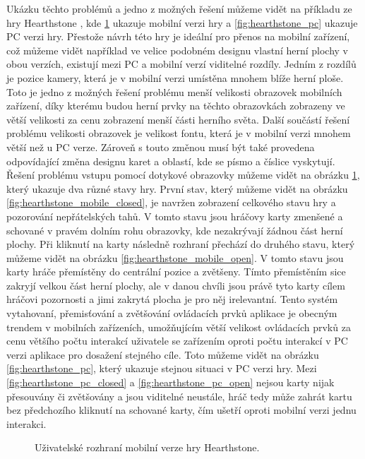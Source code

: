 Ukázku těchto problémů a jedno z možných řešení můžeme vidět na příkladu ze hry Hearthstone \citep{site:hearthstone}, kde  \ref{fig:hearthstone_mobile} ukazuje mobilní verzi hry a \ref{fig:hearthstone_pc} ukazuje PC verzi hry. Přestože návrh této hry je ideální pro přenos na mobilní zařízení, což můžeme vidět například ve velice podobném designu vlastní herní plochy v obou verzích, existují mezi PC a mobilní verzí viditelné rozdíly. Jedním z rozdílů je pozice kamery, která je v mobilní verzi umístěna mnohem blíže herní ploše. Toto je jedno z možných řešení problému menší velikosti obrazovek mobilních zařízení, díky kterému budou herní prvky na těchto obrazovkách zobrazeny ve větší velikosti za cenu zobrazení menší části herního světa. Další součástí řešení problému velikosti obrazovek je velikost fontu, která je v mobilní verzi mnohem větší než u PC verze. Zároveň s touto změnou musí být také provedena odpovídající změna designu karet a oblastí, kde se písmo a číslice vyskytují. Řešení problému vstupu pomocí dotykové obrazovky můžeme vidět na obrázku \ref{fig:hearthstone_mobile}, který ukazuje dva různé stavy hry. První stav, který můžeme vidět na obrázku \ref{fig:hearthstone_mobile_closed}, je navržen zobrazení celkového stavu hry a pozorování nepřátelských tahů. V tomto stavu jsou hráčovy karty zmenšené a schované v pravém dolním rohu obrazovky, kde nezakrývají žádnou část herní plochy. Při kliknutí na karty následně rozhraní přechází do druhého stavu, který můžeme vidět na obrázku \ref{fig:hearthstone_mobile_open}. V tomto stavu jsou karty hráče přemístěny do centrální pozice a zvětšeny. Tímto přemístěním sice zakryjí velkou část herní plochy, ale v danou chvíli jsou právě tyto karty cílem hráčovi pozornosti a jimi zakrytá plocha je pro něj irelevantní. Tento systém vytahovaní, přemisťování a zvětšování ovládacích prvků aplikace je obecným trendem v mobilních zařízeních, umožňujícím větší velikost ovládacích prvků za cenu většího počtu interakcí uživatele se zařízením oproti počtu interakcí v PC verzi aplikace pro dosažení stejného cíle. Toto můžeme vidět na obrázku \ref{fig:hearthstone_pc}, který ukazuje stejnou situaci v PC verzi hry. Mezi \ref{fig:hearthstone_pc_closed} a \ref{fig:hearthstone_pc_open} nejsou karty nijak přesouvány či zvětšovány a jsou viditelné neustále, hráč tedy může zahrát kartu bez předchozího kliknutí na schované karty, čím ušetří oproti mobilní verzi jednu interakci.
\begin{figure}[!tbp]
	\centering
	\hfill
	\caption{Uživatelské rozhraní mobilní verze hry Hearthstone.}
	\label{fig:hearthstone_mobile}
\end{figure}

